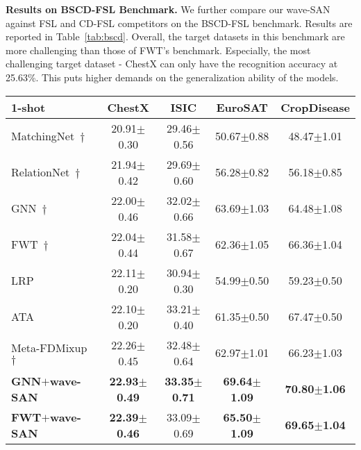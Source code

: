 \documentclass{article}
\newcommand{\mypm}{\scriptsize$\pm$}
\begin{document}
\noindent\textbf{Results on BSCD-FSL Benchmark.} 
We further compare our wave-SAN against FSL and CD-FSL competitors on the BSCD-FSL benchmark. Results are reported in Table~\ref{tab:bscd}. Overall, the target datasets in this benchmark are more challenging than those of FWT's benchmark. Especially, the most challenging target dataset - ChestX can only have the recognition accuracy at 25.63\%. This puts higher demands on the generalization ability of the models. 


\begin{table*}[h]\small
\begin{center}
\begin{tabular}{lcccc}
\toprule
\textbf{1-shot}
& \textbf{ChestX}        
& \textbf{ISIC}
& \textbf{EuroSAT}
& \textbf{CropDisease}  \\ \hline
MatchingNet~\cite{vinyals2016matching}$\dagger$& 20.91\mypm0.30 & 29.46\mypm0.56 & 50.67\mypm0.88 & 48.47\mypm1.01 \\

RelationNet~\cite{sung2018learning}$\dagger$ & 21.94\mypm0.42 & 29.69\mypm0.60 & 56.28\mypm0.82 & 56.18\mypm0.85 \\


GNN~\cite{garcia2017few}$\dagger$ & 22.00\mypm0.46  & 32.02\mypm0.66 & 63.69\mypm1.03 & 64.48\mypm1.08
\\ 
\hline



FWT~\cite{tseng2020cross}$\dagger$ & 22.04\mypm0.44 & 31.58\mypm0.67 & 62.36\mypm1.05 & 66.36\mypm1.04
\\ 

LRP~\cite{sun2021explanation} & 22.11\mypm0.20 &  30.94\mypm0.30 & 54.99\mypm0.50 & 59.23\mypm0.50
\\

ATA~\cite{wang2021cross} & 22.10\mypm0.20 & 33.21\mypm0.40 & 61.35\mypm0.50 & 67.47\mypm0.50 
\\

Meta-FDMixup~\cite{fu2021meta}$\dagger$ & 22.26\mypm 0.45 &	32.48\mypm0.64 &  62.97\mypm 1.01 &	66.23\mypm1.03 
\\
\hline

\textbf{GNN$+$wave-SAN} 
             & \textbf{22.93\mypm0.49} & \textbf{33.35\mypm0.71} & \textbf{69.64\mypm1.09} & \textbf{70.80\mypm1.06}  \\
\textbf{FWT$+$wave-SAN} 
             & \textbf{22.39\mypm0.46} & 
             33.09\mypm0.69
             &  \textbf{65.50\mypm1.09} &  \textbf{69.65\mypm1.04} \\ 


\end{tabular}
\end{center}
\end{table*}
\end{document}
